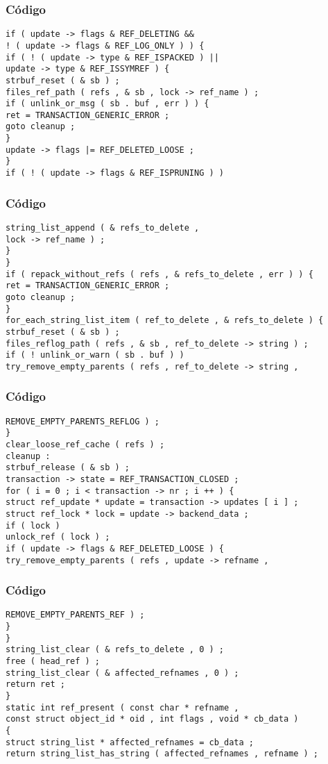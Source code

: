 \documentclass{beamer}
\begin{document}
\begin{frame}[fragile]
\frametitle{C\'odigo}
\begin{verbatim}
if ( update -> flags & REF_DELETING && 
! ( update -> flags & REF_LOG_ONLY ) ) { 
if ( ! ( update -> type & REF_ISPACKED ) || 
update -> type & REF_ISSYMREF ) { 
strbuf_reset ( & sb ) ; 
files_ref_path ( refs , & sb , lock -> ref_name ) ; 
if ( unlink_or_msg ( sb . buf , err ) ) { 
ret = TRANSACTION_GENERIC_ERROR ; 
goto cleanup ; 
} 
update -> flags |= REF_DELETED_LOOSE ; 
} 
if ( ! ( update -> flags & REF_ISPRUNING ) ) 
\end{verbatim}
\end{frame}
\begin{frame}[fragile]
\frametitle{C\'odigo}
\begin{verbatim}
string_list_append ( & refs_to_delete , 
lock -> ref_name ) ; 
} 
} 
if ( repack_without_refs ( refs , & refs_to_delete , err ) ) { 
ret = TRANSACTION_GENERIC_ERROR ; 
goto cleanup ; 
} 
for_each_string_list_item ( ref_to_delete , & refs_to_delete ) { 
strbuf_reset ( & sb ) ; 
files_reflog_path ( refs , & sb , ref_to_delete -> string ) ; 
if ( ! unlink_or_warn ( sb . buf ) ) 
try_remove_empty_parents ( refs , ref_to_delete -> string , 
\end{verbatim}
\end{frame}
\begin{frame}[fragile]
\frametitle{C\'odigo}
\begin{verbatim}
REMOVE_EMPTY_PARENTS_REFLOG ) ; 
} 
clear_loose_ref_cache ( refs ) ; 
cleanup : 
strbuf_release ( & sb ) ; 
transaction -> state = REF_TRANSACTION_CLOSED ; 
for ( i = 0 ; i < transaction -> nr ; i ++ ) { 
struct ref_update * update = transaction -> updates [ i ] ; 
struct ref_lock * lock = update -> backend_data ; 
if ( lock ) 
unlock_ref ( lock ) ; 
if ( update -> flags & REF_DELETED_LOOSE ) { 
try_remove_empty_parents ( refs , update -> refname , 
\end{verbatim}
\end{frame}
\begin{frame}[fragile]
\frametitle{C\'odigo}
\begin{verbatim}
REMOVE_EMPTY_PARENTS_REF ) ; 
} 
} 
string_list_clear ( & refs_to_delete , 0 ) ; 
free ( head_ref ) ; 
string_list_clear ( & affected_refnames , 0 ) ; 
return ret ; 
} 
static int ref_present ( const char * refname , 
const struct object_id * oid , int flags , void * cb_data ) 
{ 
struct string_list * affected_refnames = cb_data ; 
return string_list_has_string ( affected_refnames , refname ) ; 
\end{verbatim}
\end{frame}
\end{document}
